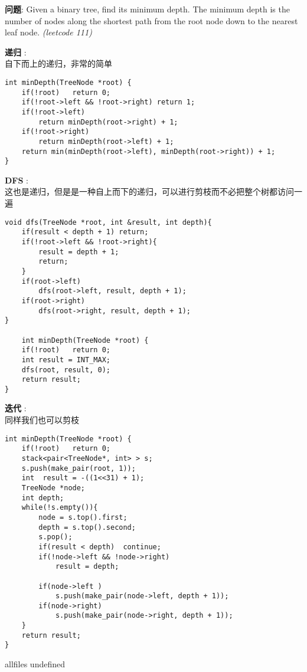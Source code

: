 \documentclass{article}
\begin{document}
\begin{CJK}{UTF8}{gbsn}     %

\else
	
\begin{description}
	\item{\textbf{问题}}: Given a binary tree, find its minimum depth. The minimum depth is the number of nodes along the shortest path from the root node down to the nearest leaf node. \textit{(leetcode 111)}
	\item{\textbf{递归}} : 
	\\自下而上的递归，非常的简单
	\begin{lstlisting}
int minDepth(TreeNode *root) {
	if(!root)	return 0;
	if(!root->left && !root->right)	return 1;
	if(!root->left)
		return minDepth(root->right) + 1;
	if(!root->right)
		return minDepth(root->left) + 1;
	return min(minDepth(root->left), minDepth(root->right)) + 1;
}
	\end{lstlisting}
	\item{\textbf{DFS}} : 
	\\这也是递归，但是是一种自上而下的递归，可以进行剪枝而不必把整个树都访问一遍
	\begin{lstlisting}
void dfs(TreeNode *root, int &result, int depth){
	if(result < depth + 1) return;
	if(!root->left && !root->right){
		result = depth + 1;
		return;
	}
	if(root->left)
		dfs(root->left, result, depth + 1);
	if(root->right)
		dfs(root->right, result, depth + 1);
}

	int minDepth(TreeNode *root) {
	if(!root)	return 0;
	int result = INT_MAX;
	dfs(root, result, 0);
	return result;
}
	\end{lstlisting}
	\item{\textbf{迭代}} : 
	\\同样我们也可以剪枝
	\begin{lstlisting}
int minDepth(TreeNode *root) {
	if(!root)	return 0;
	stack<pair<TreeNode*, int> > s;
	s.push(make_pair(root, 1));
	int	 result = -((1<<31) + 1);
	TreeNode *node;
	int depth;
	while(!s.empty()){
		node = s.top().first;
		depth = s.top().second;
		s.pop();
		if(result < depth)	continue;
		if(!node->left && !node->right)
			result = depth;
	
		if(node->left )
			s.push(make_pair(node->left, depth + 1));
		if(node->right)
			s.push(make_pair(node->right, depth + 1));
	}
	return result;
}
	\end{lstlisting}
\end{description}

\fi

\ifx allfiles undefined
\end{CJK}
\end{document}
